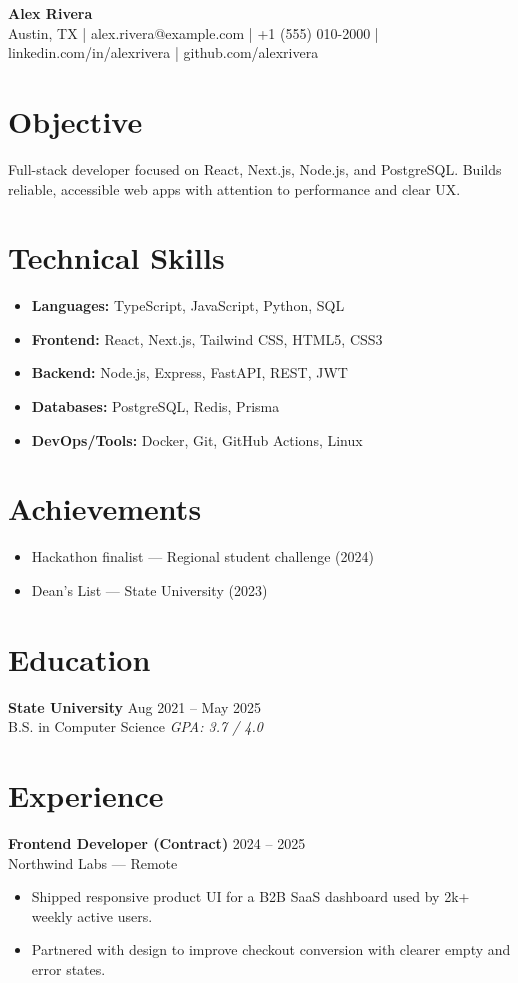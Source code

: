 \documentclass[10.5pt, a4paper]{article}
\begin{document}
\begin{center}
    {\Large \textbf{Alex Rivera}} \\[2pt]
    Austin, TX \quad | \quad alex.rivera@example.com \quad | \quad +1 (555) 010-2000 \quad | \quad linkedin.com/in/alexrivera \quad | \quad github.com/alexrivera
\end{center}

\section*{Objective}
Full-stack developer focused on React, Next.js, Node.js, and PostgreSQL. Builds reliable, accessible web apps with attention to performance and clear UX.

\section*{Technical Skills}
\begin{itemize}
    \item \textbf{Languages:} TypeScript, JavaScript, Python, SQL
    \item \textbf{Frontend:} React, Next.js, Tailwind CSS, HTML5, CSS3
    \item \textbf{Backend:} Node.js, Express, FastAPI, REST, JWT
    \item \textbf{Databases:} PostgreSQL, Redis, Prisma
    \item \textbf{DevOps/Tools:} Docker, Git, GitHub Actions, Linux
\end{itemize}

\section*{Achievements}
\begin{itemize}
    \item Hackathon finalist --- Regional student challenge (2024)
    \item Dean's List --- State University (2023)
\end{itemize}

\section*{Education}
\textbf{State University} \hfill Aug 2021 -- May 2025 \\
B.S. in Computer Science \hfill \textit{GPA: 3.7 / 4.0}

\section*{Experience}
\textbf{Frontend Developer (Contract)} \hfill 2024 -- 2025 \\
Northwind Labs --- Remote \\
\begin{itemize}
    \item Shipped responsive product UI for a B2B SaaS dashboard used by 2k+ weekly active users.
    \item Partnered with design to improve checkout conversion with clearer empty and error states.
\end{itemize}
\end{document}
